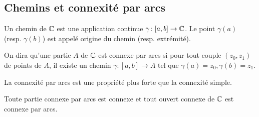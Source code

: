 \subsection{Chemins et connexité par arcs}
\begin{fdefn}
Un chemin de $\mathbb{C}$ est une application continue $\gamma \colon [a,b] \to \mathbb{C}$.
Le point $\gamma(a)$ (resp. $\gamma(b)$) est appelé origine du chemin (resp. extrémité).
\end{fdefn}
\begin{fdefn}
On dira qu'une partie $A$ de $\mathbb{C}$ est connexe par arcs si pour tout couple $(z_0,z_1)$ de points de $A$, il existe un chemin $\gamma \colon [a,b]\to A$ tel que $\gamma(a) = z_0, \gamma(b)=z_1$.
\end{fdefn}
La connexité par arcs est une propriété plus forte que la connexité simple. 
\begin{fprop}
\label{prop:ouvert_connexe}
Toute partie connexe par arcs est connexe et tout ouvert connexe de $\mathbb{C}$ est connexe par arcs. 
\end{fprop}
